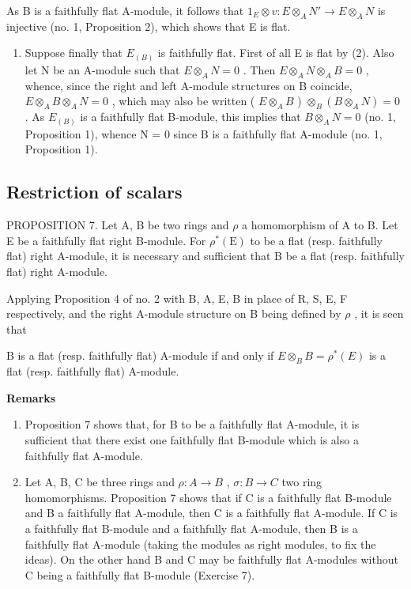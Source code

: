 As B is a faithfully flat A-module, it follows that \(1_{E} \otimes v: E \otimes_{A} N' \to E \otimes_{A} N\) is injective (no. 1, Proposition 2), which shows that E is flat.

\begin{enumerate}
\def\labelenumi{(\arabic{enumi})}
\setcounter{enumi}{2}
\tightlist
\item
  Suppose finally that \(E_{(B)}\) is faithfully flat. First of all E is flat by (2). Also let N be an A-module such that \(E \otimes_{A} N = 0\) . Then \(E \otimes_{A} N \otimes_{A} B = 0\) , whence, since the right and left A-module structures on B coincide, \(E \otimes_{A} B \otimes_{A} N = 0\) , which may also be written ( \(E \otimes_{A} B\) ) \(\otimes_{B} (B \otimes_{A} N) = 0\) . As \(E_{(B)}\) is a faithfully flat B-module, this implies that \(B \otimes_{A} N = 0\) (no. 1, Proposition 1), whence N = 0 since B is a faithfully flat A-module (no. 1, Proposition 1).
\end{enumerate}

\subsection{Restriction of scalars}

PROPOSITION 7. Let A, B be two rings and \(\rho\) a homomorphism of A to B. Let E be a faithfully flat right B-module. For \(\rho^{*}(\mathrm{E})\) to be a flat (resp. faithfully flat) right A-module, it is necessary and sufficient that B be a flat (resp. faithfully flat) right A-module.

Applying Proposition 4 of no. 2 with B, A, E, B in place of R, S, E, F respectively, and the right A-module structure on B being defined by \(\rho\) , it is seen that

B is a flat (resp. faithfully flat) A-module if and only if \(E \otimes_{B} B = \rho^{*}(E)\) is a flat (resp. faithfully flat) A-module.

\textbf{Remarks}\par

\begin{enumerate}
\def\labelenumi{(\arabic{enumi})}
\item
  Proposition 7 shows that, for B to be a faithfully flat A-module, it is sufficient that there exist one faithfully flat B-module which is also a faithfully flat A-module.
\item
  Let A, B, C be three rings and \(\rho: A \rightarrow B\) , \(\sigma: B \rightarrow C\) two ring homomorphisms. Proposition 7 shows that if C is a faithfully flat B-module and B a faithfully flat A-module, then C is a faithfully flat A-module. If C is a faithfully flat B-module and a faithfully flat A-module, then B is a faithfully flat A-module (taking the modules as right modules, to fix the ideas). On the other hand B and C may be faithfully flat A-modules without C being a faithfully flat B-module (Exercise 7).
\end{enumerate}


